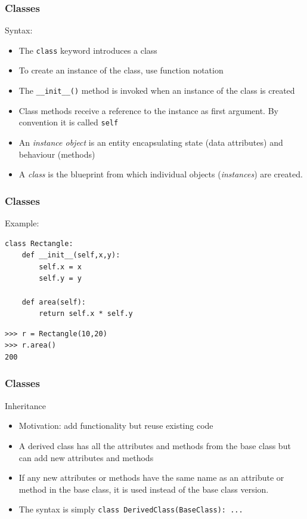 \begin{frame}[fragile]
\frametitle{Classes}
Syntax:
\begin{itemize}
  \item The \verb#class# keyword introduces a class
  \item To create an instance of the class, use function notation
  \item The \verb#__init__()# method is invoked when an instance of the class is
  created
  \item Class methods receive a reference to the instance as first argument. By
  convention it is called \verb#self#
  \item An \textit{instance object} is an entity encapsulating state (data
  attributes) and behaviour (methods)
  \item A \textit{class} is the blueprint from which individual objects
  (\textit{instances}) are created.
\end{itemize}
\end{frame}

\begin{frame}[fragile]
    \frametitle{Classes}
Example:
    \begin{myColorBox}{0.9}{}
\small
\begin{verbatim}
class Rectangle:
    def __init__(self,x,y):
        self.x = x
        self.y = y

    def area(self):
        return self.x * self.y
\end{verbatim}
    \end{myColorBox}
    \begin{myColorBox}{0.9}{}
\small
\begin{verbatim}
>>> r = Rectangle(10,20)
>>> r.area()
200
\end{verbatim}
    \end{myColorBox}
\end{frame}

\begin{frame}[fragile]
\frametitle{Classes}
Inheritance
\begin{itemize}
  \item Motivation: add functionality but reuse existing code
  \item A derived class has all the attributes and methods from the base class
  but can add new attributes and methods
  \item If any new attributes or methods have the same name as an attribute or
  method in the base class, it is used instead of the base class version.
  \item The syntax is simply \verb#class DerivedClass(BaseClass): ...#
\end{itemize}
\end{frame}

